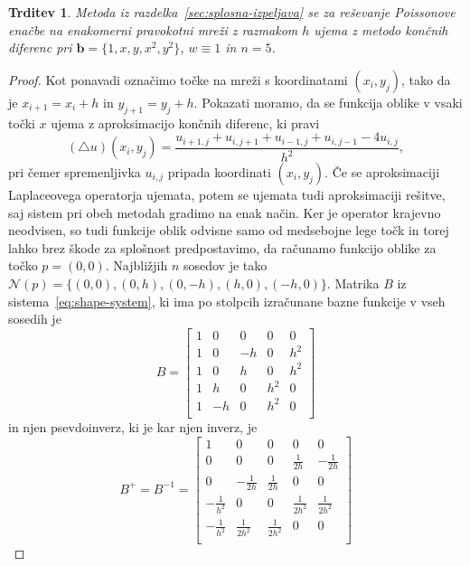 \documentclass[12pt,a4paper,twoside]{article}
\theoremstyle{definition} %
\theoremstyle{plain} %
\newtheorem{trditev}[definicija]{Trditev}
\numberwithin{equation}{section}
\newcommand{\Nc}{\mathcal{N}}
\newcommand{\lap}{\triangle}
\renewcommand{\b}{\boldsymbol}
\begin{document}
\begin{trditev}
  \label{trd:eq-to-fdm}
  Metoda iz razdelka~\ref{sec:splosna-izpeljava} se za reševanje Poissonove
  enačbe na enakomerni pravokotni mreži z razmakom $h$ ujema z metodo končnih
  diferenc pri $\b{b} = \{1, x, y, x^2, y^2\}$, $w \equiv 1$ in
  $n=5$.
\end{trditev}
\begin{proof}
Kot ponavadi označimo točke na mreži s koordinatami $(x_i, y_j)$, tako da je
$x_{i+1} = x_i + h$ in $y_{j+1} = y_j + h$.
Pokazati moramo, da se funkcija oblike v vsaki točki $x$ ujema z aproksimacijo končnih diferenc, ki
pravi
\begin{equation}
  (\lap u)(x_i, y_j) = \frac{u_{i+1,j} + u_{i, j+1} + u_{i-1,j} + u_{i, j-1} - 4u_{i,j}}{h^2},
\end{equation}
pri čemer spremenljivka $u_{i, j}$ pripada koordinati $(x_i, y_j)$. Če se
aproksimaciji Laplaceovega operatorja ujemata, potem se ujemata tudi
aproksimaciji rešitve, saj sistem pri obeh metodah gradimo na enak način.
Ker je operator krajevno neodvisen, so tudi funkcije oblik odvisne samo od
medsebojne lege točk in torej lahko brez škode
za splošnost predpostavimo, da računamo funkcijo oblike za točko
$p = (0, 0)$. Najbližjih $n$ sosedov je tako $\Nc(p) = \{(0, 0), (0, h), (0, -h),
(h, 0), (-h, 0)\}$. Matrika $B$ iz sistema~\eqref{eq:shape-system},
ki ima po stolpcih izračunane bazne funkcije v vseh sosedih je
\begin{equation}
  \label{eq:fdm-special-case-start}
  B =
  \begin{bmatrix}
    1 & 0 & 0 & 0 & 0 \\
    1 & 0 & -h & 0 & h^2 \\
    1 & 0 & h & 0 & h^2 \\
    1 & h & 0 & h^2 & 0 \\
    1 & -h & 0 & h^2 & 0 \\
  \end{bmatrix}
\end{equation}
in njen psevdoinverz, ki je kar njen inverz, je
\begin{equation}
  B^+ = B^{-1} =
  \begin{bmatrix}
     1 & 0 & 0 & 0 & 0 \\
 0 & 0 & 0 & \frac{1}{2 h} & -\frac{1}{2 h} \\
 0 & -\frac{1}{2 h} & \frac{1}{2 h} & 0 & 0 \\
 -\frac{1}{h^2} & 0 & 0 & \frac{1}{2 h^2} & \frac{1}{2 h^2} \\
 -\frac{1}{h^2} & \frac{1}{2 h^2} & \frac{1}{2 h^2} & 0 & 0 \\

\end{bmatrix}
\end{equation}
\end{proof}
\end{document}
